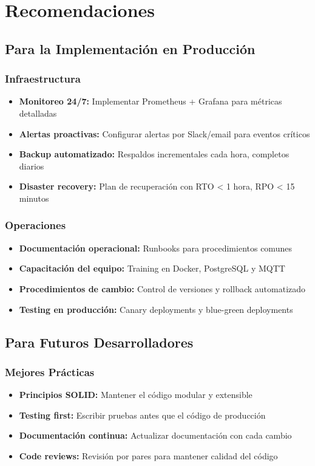 \section{Recomendaciones}

\subsection{Para la Implementación en Producción}

\subsubsection{Infraestructura}
\begin{itemize}
    \item \textbf{Monitoreo 24/7:} Implementar Prometheus + Grafana para métricas detalladas
    \item \textbf{Alertas proactivas:} Configurar alertas por Slack/email para eventos críticos
    \item \textbf{Backup automatizado:} Respaldos incrementales cada hora, completos diarios
    \item \textbf{Disaster recovery:} Plan de recuperación con RTO < 1 hora, RPO < 15 minutos
\end{itemize}

\subsubsection{Operaciones}
\begin{itemize}
    \item \textbf{Documentación operacional:} Runbooks para procedimientos comunes
    \item \textbf{Capacitación del equipo:} Training en Docker, PostgreSQL y MQTT
    \item \textbf{Procedimientos de cambio:} Control de versiones y rollback automatizado
    \item \textbf{Testing en producción:} Canary deployments y blue-green deployments
\end{itemize}

\subsection{Para Futuros Desarrolladores}

\subsubsection{Mejores Prácticas}
\begin{itemize}
    \item \textbf{Principios SOLID:} Mantener el código modular y extensible
    \item \textbf{Testing first:} Escribir pruebas antes que el código de producción
    \item \textbf{Documentación continua:} Actualizar documentación con cada cambio
    \item \textbf{Code reviews:} Revisión por pares para mantener calidad del código
\end{itemize}

